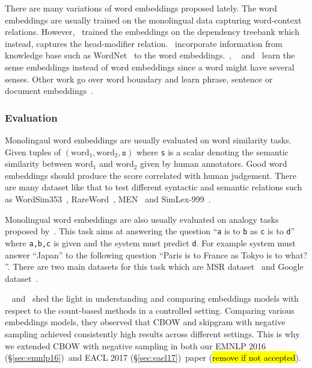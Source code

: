 \documentclass[12pt,twoside,final,hidelinks]{ltthesis}
\theoremstyle{definition}
\newcommand\emnlpvi{EMNLP 2016 (\S\ref{sec:emnlp16})}
\newcommand\eaclvii{EACL 2017 (\S\ref{sec:eacl17})}
\newcommand{\tofix}[1]{\hl{#1}}
\begin{document}
There are many variations of word embeddings proposed lately. The word embeddings are usually trained on the monolingual data capturing word-context relations. 
However,~ trained the embeddings on the dependency treebank which instead, captures the head-modifier 
relation.~ incorporate information from knowledge base such as WordNet~\cite{Miller:1995:WLD:219717.219748} to the word 
embeddings.~, ~ and~ learn the sense 
embeddings instead of word embeddings since a word might have several senses. Other work go over word boundary and learn phrase, sentence or document 
embeddings~\cite{DBLP:journals/corr/KirosZSZTUF15,DBLP:journals/corr/TaiSM15,kalchbrenner-grefenstette-blunsom:2014:P14-1,DBLP:conf/icml/LeM14}. 
	
\subsubsection{Evaluation}
Monolingaul word embeddings are usually evaluated on word similarity tasks. Given tuples of $(\text{word}_1,\text{word}_2,\texttt{s})$ where \texttt{s} is a scalar denoting the semantic similarity between $\text{word}_1$ and $\text{word}_2$ given by human annotators. Good word embeddings should produce the score correlated with human judgement. There are many dataset like that to test different syntactic and semantic relations such as WordSim353~\cite{ws353}, RareWord~\cite{Luong-etal:naacl15:bivec}, MEN~\cite{DBLP:conf/acl/BruniBBT12} and SimLex-999~\cite{DBLP:journals/coling/HillRK15}. 

Monolingual word embeddings are also usually evaluated on analogy tasks proposed by~. This task aims at answering the question ``\texttt{a} is to \texttt{b} as \texttt{c} is to \texttt{d}'' where \texttt{a,b,c} is given and the system must predict \texttt{d}. For example system must answer ``Japan'' to the following question ``Paris is to France as Tokyo is to what$?$''. There are two main datasets for this task which are MSR dataset~\cite{mikolov-yih-zweig:2013:NAACL-HLT} and Google dataset~\cite{DBLP:journals/corr/abs-1301-3781}. 

~ and~ shed the light in understanding and comparing embeddings models with respect to the count-based methods in a controlled setting. Comparing various embeddings models, they observed that CBOW and skipgram with negative sampling achieved consistently high results across different settings. This is why we extended CBOW with negative sampling in both our \emnlpvi\ and \eaclvii\ paper (\tofix{remove if not accepted}). 
\end{document}
